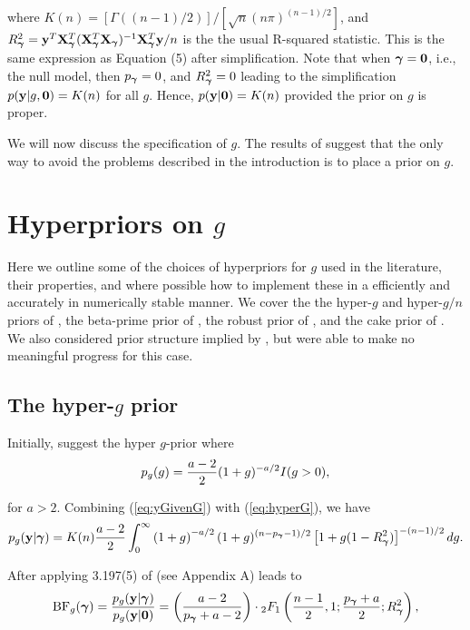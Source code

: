 \noindent where $K(n) = [\Gamma( (n-1)/2 )]/[\sqrt{n}(n\pi)^{(n-1)/2}]$, and
$R_{\boldsymbol \gamma}^2 = {\bf y}^T{\bf X}_{\boldsymbol \gamma}^T({\bf X}_{\boldsymbol \gamma}^T{\bf X}_{\boldsymbol \gamma})^{-1}{\bf X}_{\boldsymbol \gamma}^T{\bf y}/n$ is 
the the usual R-squared statistic.
This is the same expression as \cite{Liang2008} Equation (5) 
after simplification. Note that
when ${\boldsymbol \gamma} = {\bf 0}$, i.e., the null model, then $p_{\boldsymbol \gamma} = 0$, and
$R_{\boldsymbol \gamma}^2 = 0$ leading to the simplification $p({\bf y}|g,{\bf 0}) = K(n)$
for all $g$. Hence, $p({\bf y}|{\bf 0}) = K(n)$ provided the prior on $g$ is proper.

We will now discuss the specification of $g$.
The results of \cite{Liang2008} suggest that the only way to 
avoid the problems described in the introduction is to place a prior on $g$.

\section{Hyperpriors on $g$}

Here we outline some of the choices of hyperpriors for $g$ used in the literature, their
properties, and where possible how to implement these in a efficiently and 
accurately in
numerically stable manner. We cover the 
the hyper-$g$ and hyper-$g/n$ priors of \cite{Liang2008}, the beta-prime prior
of \cite{Maruyama2011}, the robust prior of \cite{Bayarri2012}, and the cake
prior of \cite{OrmerodEtal2017}.
We also considered prior structure implied by \cite{Zellner1980}, but were able to make no
meaningful progress for this case.


\subsection{The hyper-$g$ prior}

Initially, \cite{Liang2008} suggest the hyper $g$-prior where
\begin{equation}\label{eq:hyperG}
\displaystyle p_{g}(g) = \frac{a - 2}{2}(1 + g)^{-a/2}I(g>0),
\end{equation}

\noindent for $a>2$. Combining (\ref{eq:yGivenG}) with (\ref{eq:hyperG}), we have
\begin{equation}\label{eq:hyperGmarginalIntegral}
p_{g}({\bf y}|{\boldsymbol \gamma}) = K(n) \frac{a - 2}{2}  \int_0^\infty 
\left( 1 + g \right)^{-a/2}
(1 + g)^{(n-p_{\boldsymbol \gamma}-1)/2} \left[ 1 + g (1 - R_{\boldsymbol \gamma}^2) \right]^{-(n-1)/2}  dg.
\end{equation}

\noindent After applying 
3.197(5) of \cite{Gradshteyn2007} (see Appendix A) leads to
\begin{equation}\label{eq:hyperGmarginal}
\displaystyle \mbox{BF}_{g}({\boldsymbol \gamma}) = \frac{p_{g}({\bf y}|{\boldsymbol \gamma})}{p_{g}({\bf y}|{\bf 0})} =  \left( \frac{a - 2}{p_{\boldsymbol \gamma} + a - 2} \right) \cdot {}_2F_1\left( \frac{n-1}{2}, 1; \frac{p_{\boldsymbol \gamma} + a}{2}; R_{\boldsymbol \gamma}^2 \right),
\end{equation}

